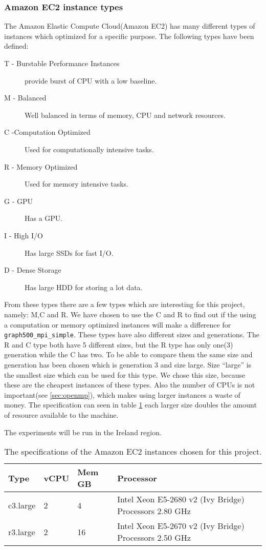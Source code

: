 \subsubsection{Amazon EC2 instance types}
\label{hw:Amazon}
The Amazon Elastic Compute Cloud(Amazon EC2) has many different types of instances which optimized for a specific purpose\cite{amazon-instances}. The following types have been defined:
\begin{description}
\item[T - Burstable Performance Instances] provide burst of CPU with a low baseline.
\item[M - Balanced] Well balanced in terms of memory, CPU and network resources.
\item[C -Computation Optimized] Used for computationally intensive tasks.
\item[R - Memory Optimized] Used for memory intensive tasks.
\item[G - GPU] Has a GPU.
\item[I - High I/O] Has large SSDs for fast I/O.
\item[D - Dense Storage] Has large HDD for storing a lot data.
\end{description}
From these types there are a few types which are interesting for this project, namely: M,C and R. We have chosen to use the C and R to find out if the using a computation or memory optimized instances will make a difference for \texttt{graph500\_mpi\_simple}.
These types have also different sizes and generations. The R and C type both have 5 different sizes, but the R type has only one(3) generation while the C has two. To be able to compare them the same size and generation has been chosen which is generation 3 and size large. Size ``large'' is the smallest size which can be used for this type. We chose this size, because these are the cheapest instances of these types. Also the number of CPUs is not important(see \ref{sec:openmp}), which makes using larger instances a waste of money. The specification can seen in table \ref{tab:specs-amazon} each larger size doubles the amount of resource available to the machine.

The experiments will be run in the Ireland region.

\begin{table}[!h]
\begin{center}
\begin{tabular}{|l|l|l|l|}
\hline
Type & vCPU & Mem GB & Processor \\ \hline
c3.large & 2 & 4 & Intel Xeon E5-2680 v2 (Ivy Bridge) Processors 2.80 GHz \\ \hline
r3.large & 2 & 16 & Intel Xeon E5-2670 v2 (Ivy Bridge) Processors 2.50 GHz \\ \hline
\end{tabular}
\end{center}
\caption{The specifications of the Amazon EC2 instances chosen for this project.}
\label{tab:specs-amazon}
\end{table}

